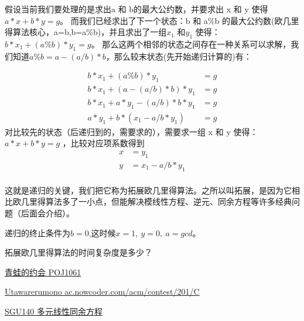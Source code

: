 假设当前我们要处理的是求出a 和 b的最大公约数，并要求出 x 和 y 使得 $a * x + b * y=g$。
而我们已经求出了下一个状态：b 和 a\%b 的最大公约数({\heiti 欧几里得算法核心，a=b,b=a\%b})，并且求出了一组$x_1$ 和$y_1$ 使得：$ b * x_1 + (a\%b) * y_1 = g$。
那么这两个相邻的状态之间存在一种关系可以求解，我们知道$a\%b = a - (a/b)*b$，那么较末状态(先开始递归计算的)有：

\begin{align*}
b * x_1 + (a\%b) * y_1 &= g\\
b*x_{1} + (a-(a/b)*b) * y_{1} &= g \\
b*x_{1} + a*y_{1}-(a/b)*b*y_{1} &=g\\
a*y_{1} + b*(x_{1}-a/b*y_{1})&= g
\end{align*}
对比较先的状态（后递归到的，需要求的），需要求一组 x 和 y 使得：$a*x + b*y = g$ ，比较对应项系数得到
\begin{align*}
x &= y_1\\
y &= x_1 - a/b * y_1 \\
\end{align*}


这就是递归的关键，我们把它称为{\heiti 拓展欧几里得算法}。之所以叫拓展，是因为它相比欧几里得算法多了一小点，但能解决模线性方程、逆元、同余方程等许多经典问题（后面会介绍）。

递归的终止条件为$b=0$,这时候$x=1,\ y=0,\ a = gcd$。



\vbox{}

\begin{problemset}
	\item 拓展欧几里得算法的时间复杂度是多少？
	\item \href{http://poj.org/problem?id=1061}{青蛙的约会 \quad POJ1061} 
	\item \href{https://ac.nowcoder.com/acm/contest/201/C}{Utawarerumono \quad ac.nowcoder.com/acm/contest/201/C}
	\item \href{https://codeforces.com/problemsets/acmsguru/problem/99999/140}{SGU140 \quad 多元线性同余方程} 
\end{problemset}










